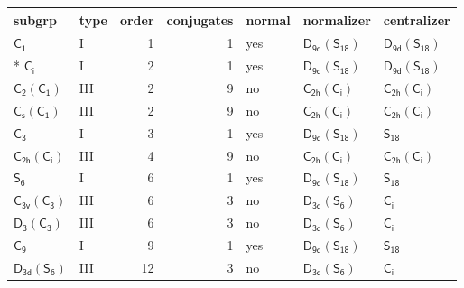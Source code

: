 \documentclass[10pt,a4paper]{article}
\numberwithin{equation}{section}
\newcommand{\grp}[1]{\mathsf{#1}}
\begin{document}
{\small\begin{longtable}{@{}llrrlll@{}}\toprule
subgrp & type & order & conjugates & normal & normalizer & centralizer\\\midrule\endhead
\bottomrule\endfoot\endlastfoot
\href{../../../rotation/data/pdf/C1.pdf}{$\grp{C_{1}}$} & I & 1 & 1 & yes & \href{D9d-S18.pdf}{$\grp{D_{9d}}(\grp{S_{18}})$} & \href{D9d-S18.pdf}{$\grp{D_{9d}}(\grp{S_{18}})$}\\*
\href{../../../rotation/data/pdf/S2.pdf}{$\grp{C_{i}}$} & I & 2 & 1 & yes & \href{D9d-S18.pdf}{$\grp{D_{9d}}(\grp{S_{18}})$} & \href{D9d-S18.pdf}{$\grp{D_{9d}}(\grp{S_{18}})$}\\
\href{C2-C1.pdf}{$\grp{C_{2}}(\grp{C_{1}})$} & III & 2 & 9 & no & \href{C2h-S2.pdf}{$\grp{C_{2h}}(\grp{C_{i}})$} & \href{C2h-S2.pdf}{$\grp{C_{2h}}(\grp{C_{i}})$}\\
\href{C1v-C1.pdf}{$\grp{C_{s}}(\grp{C_{1}})$} & III & 2 & 9 & no & \href{C2h-S2.pdf}{$\grp{C_{2h}}(\grp{C_{i}})$} & \href{C2h-S2.pdf}{$\grp{C_{2h}}(\grp{C_{i}})$}\\
\href{../../../rotation/data/pdf/C3.pdf}{$\grp{C_{3}}$} & I & 3 & 1 & yes & \href{D9d-S18.pdf}{$\grp{D_{9d}}(\grp{S_{18}})$} & \href{../../../rotation/data/pdf/S18.pdf}{$\grp{S_{18}}$}\\
\href{C2h-S2.pdf}{$\grp{C_{2h}}(\grp{C_{i}})$} & III & 4 & 9 & no & \href{C2h-S2.pdf}{$\grp{C_{2h}}(\grp{C_{i}})$} & \href{C2h-S2.pdf}{$\grp{C_{2h}}(\grp{C_{i}})$}\\
\href{../../../rotation/data/pdf/S6.pdf}{$\grp{S_{6}}$} & I & 6 & 1 & yes & \href{D9d-S18.pdf}{$\grp{D_{9d}}(\grp{S_{18}})$} & \href{../../../rotation/data/pdf/S18.pdf}{$\grp{S_{18}}$}\\
\href{C3v-C3.pdf}{$\grp{C_{3v}}(\grp{C_{3}})$} & III & 6 & 3 & no & \href{D3d-S6.pdf}{$\grp{D_{3d}}(\grp{S_{6}})$} & \href{../../../rotation/data/pdf/S2.pdf}{$\grp{C_{i}}$}\\
\href{D3-C3.pdf}{$\grp{D_{3}}(\grp{C_{3}})$} & III & 6 & 3 & no & \href{D3d-S6.pdf}{$\grp{D_{3d}}(\grp{S_{6}})$} & \href{../../../rotation/data/pdf/S2.pdf}{$\grp{C_{i}}$}\\
\href{../../../rotation/data/pdf/C9.pdf}{$\grp{C_{9}}$} & I & 9 & 1 & yes & \href{D9d-S18.pdf}{$\grp{D_{9d}}(\grp{S_{18}})$} & \href{../../../rotation/data/pdf/S18.pdf}{$\grp{S_{18}}$}\\
\href{D3d-S6.pdf}{$\grp{D_{3d}}(\grp{S_{6}})$} & III & 12 & 3 & no & \href{D3d-S6.pdf}{$\grp{D_{3d}}(\grp{S_{6}})$} & \href{../../../rotation/data/pdf/S2.pdf}{$\grp{C_{i}}$}\\

\end{longtable}}
\end{document}
